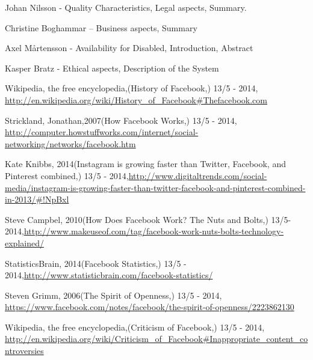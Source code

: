 \documentclass[conference]{IEEEtran}
\begin{document}
Johan Nilsson - Quality Characteristics, Legal aspects, Summary.

Christine Boghammar – Business aspects, Summary

Axel Mårtensson - Availability for Disabled, Introduction, Abstract

Kasper Bratz - Ethical aspects, Description of the System

\begin{thebibliography}{1}


Wikipedia, the free encyclopedia,(History of Facebook,) 13/5 - 2014,
\href{http://en.wikipedia.org/wiki/History\_of\_Facebook\#Thefacebook.com}{http://en.wikipedia.org/wiki/History\_of\_Facebook\#Thefacebook.com}

Strickland, Jonathan,2007(How Facebook Works,) 13/5 - 2014,
\href{http://computer.howstuffworks.com/internet/social-networking/networks/facebook.htm}{http://computer.howstuffworks.com/internet/social-networking/networks/facebook.htm}

Kate Knibbs,
2014(Instagram is growing faster than Twitter, Facebook, and Pinterest combined,) 13/5 - 2014,\href{http://www.digitaltrends.com/social-media/instagram-is-growing-faster-than-twitter-facebook-and-pinterest-combined-in-2013/\#!NpBxl}{http://www.digitaltrends.com/social-media/instagram-is-growing-faster-than-twitter-facebook-and-pinterest-combined-in-2013/\#!NpBxl}

Steve Campbel,
 2010(How Does Facebook Work? The Nuts and Bolts,) 13/5-2014,\href{http://www.makeuseof.com/tag/facebook-work-nuts-bolts-technology-explained/}{http://www.makeuseof.com/tag/facebook-work-nuts-bolts-technology-explained/}

StatisticsBrain,
2014(Facebook Statistics,) 13/5 - 2014,\href{http://www.statisticbrain.com/facebook-statistics/}{http://www.statisticbrain.com/facebook-statistics/}

Steven Grimm, 2006(The Spirit of Openness,) 13/5 - 2014, \href{https://www.facebook.com/notes/facebook/the-spirit-of-openness/2223862130}{https://www.facebook.com/notes/facebook/the-spirit-of-openness/2223862130}


Wikipedia, the free encyclopedia,(Criticism of Facebook,) 13/5 - 2014, \href{http://en.wikipedia.org/wiki/Criticism\_of\_Facebook\#Inappropriate\_content\_controversies}{http://en.wikipedia.org/wiki/Criticism\_of\_Facebook\#Inappropriate\_content\_controversies}


\end{thebibliography}
\end{document}
